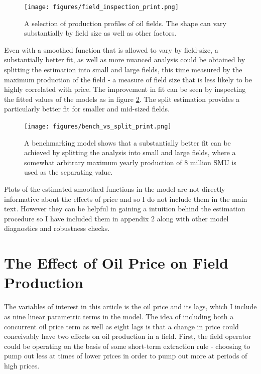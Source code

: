 \documentclass[11pt]{article}
\begin{document}
\begin{figure}
	\texttt{[image: figures/field\_inspection\_print.png]}
	\caption{A selection of production profiles of oil fields.  The shape can vary substantially by field size as well as other factors.}
	\label{field_inspection}
\end{figure}

Even with a smoothed function that is allowed to vary by field-size, a substantially better fit, as well as more nuanced analysis could be obtained by splitting the estimation into small and large fields, this time measured by the maximum production of the field - a measure of field size that is less likely to be highly correlated with price.  The improvement in fit can be seen by inspecting the fitted values of the models as in figure \ref{bench_vs_split}. The split estimation provides a particularly better fit for smaller and mid-sized fields.

\begin{figure}
	\texttt{[image: figures/bench\_vs\_split\_print.png]}
	\caption{A benchmarking model shows that a substantially better fit can be achieved by splitting the analysis into small and large fields, where a somewhat arbitrary maximum yearly production of 8 million SMU is used as the separating value.}
	\label{bench_vs_split}
\end{figure}

Plots of the estimated smoothed functions in the model are not directly informative about the effects of price and so I do not include them in the main text.  However they can be helpful in gaining a intuition behind the estimation procedure so I have included them in appendix 2 along with other model diagnostics and robustness checks.  

\section{The Effect of Oil Price on Field Production}

The variables of interest in this article is the oil price and its lags, which I include as nine linear parametric terms in the model.  The idea of including both a concurrent oil price term as well as eight lags is that a change in price could conceivably have two effects on oil production in a field.  First, the field operator could be operating on the basis of some short-term extraction rule - choosing to pump out less at times of lower prices in order to pump out more at periods of high prices.  
\end{document}
